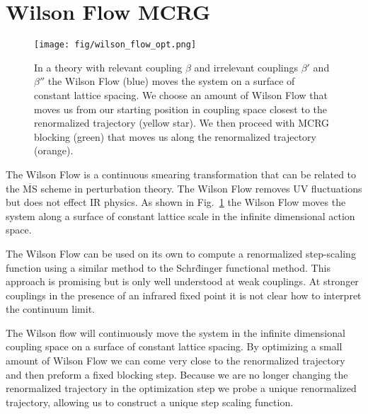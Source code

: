 \documentclass{PoS}
\newcommand{\MSbar}{\ensuremath{\overline{\textrm{MS}} } }
\newcommand{\fig}[1]{Fig.~\ref{#1}}
\begin{document}
\section{Wilson Flow MCRG}
\label{sec:wmcrg}
\begin{figure}[th]
  \centering
  \texttt{[image: fig/wilson\_flow\_opt.png]}
  \caption{In a theory with relevant coupling $\beta$ and irrelevant couplings $\beta'$ and $\beta''$ the Wilson Flow (blue) moves the system on a surface of constant lattice spacing.  We choose an amount of Wilson Flow that moves us from our starting position in coupling space closest to the renormalized trajectory (yellow star).  We then proceed with MCRG blocking (green) that moves us along the renormalized trajectory (orange).}
  \label{fig:wflow_opt}
\end{figure}

The Wilson Flow is a continuous smearing transformation\cite{Narayanan:2006rf} that can be related to the \MSbar scheme in perturbation theory\cite{Luscher:2010iy}.
The Wilson Flow removes UV fluctuations but does not effect IR physics.
As shown in \fig{fig:wflow_opt} the Wilson Flow moves the system along a surface of constant lattice scale in the infinite dimensional action space.

The Wilson Flow can be used on its own to compute a renormalized step-scaling function using a similar method to the Schr\"dinger functional method\cite{Fodor:2012td, Fodor:2012qh}.
This approach is promising but is only well understood at weak couplings.
At stronger couplings in the presence of an infrared fixed point it is not clear how to interpret the continuum limit.

The Wilson flow will continuously move the system in the infinite dimensional coupling space on a surface of constant lattice spacing.
By optimizing a small amount of Wilson Flow we can come very close to the renormalized trajectory and then preform a fixed blocking step.
Because we are no longer changing the renormalized trajectory in the optimization step we probe a unique renormalized trajectory, allowing us to construct a unique step scaling function.



\end{document}
